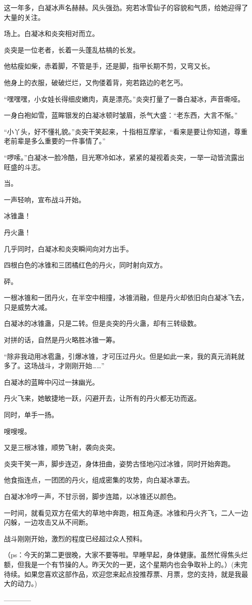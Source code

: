 \begin{this_body}
这一年多，白凝冰声名赫赫。风头强劲。宛若冰雪仙子的容貌和气质，给她迎得了大量的关注。

场上。白凝冰和炎突相对而立。

炎突是一位老者，长着一头蓬乱枯槁的长发。

他枯瘦如柴，赤着脚，不管是手，还是脚，指甲长期不剪，又弯又长。

他身上的衣服，破破烂烂，又佝偻着背，宛若路边的老乞丐。

“嘿嘿嘿，小女娃长得细皮嫩肉，真是漂亮。”炎突打量了一番白凝冰，声音嘶哑。

一身白袍如雪，蓝眸银发的白凝冰顿时皱眉，杀气大盛：“老东西，大言不惭。”

“小丫头，好不懂礼貌。”炎突干笑起来，十指相互摩挲，“看来是要让你知道，尊重老前辈是多么重要的一件事情了。”

“啰嗦。”白凝冰一脸冷酷，目光寒冷如冰，紧紧的凝视着炎突，一举一动皆流露出旺盛的斗志。

当。

一声轻响，宣布战斗开始。

冰锥蛊！

丹火蛊！

几乎同时，白凝冰和炎突瞬间向对方出手。

四根白色的冰锥和三团橘红色的丹火，同时射向双方。

砰。

一根冰锥和一团丹火，在半空中相撞，冰锥消融，但是丹火却依旧向白凝冰飞去，只是威势大减。

白凝冰的冰锥蛊，只是二转。但是炎突的丹火蛊，却有三转级数。

对拼的话，自然是丹火略胜冰锥一筹。

“除非我动用冰雹蛊，引爆冰锥，才可压过丹火。但是如此一来，我的真元消耗就多了。这场战斗，才刚刚开始……”

白凝冰的蓝眸中闪过一抹幽光。

丹火飞来，她敏捷地一跃，闪避开去，让所有的丹火都无功而返。

同时，单手一扬。

嗖嗖嗖。

又是三根冰锥，顺势飞射，袭向炎突。

炎突干笑一声，脚步连迈，身体扭曲，姿势古怪地闪过冰锥，同时开始奔跑。

他食指连点，一团团的丹火，组成密集的攻势，向白凝冰罩去。

白凝冰冷哼一声，不甘示弱，脚步连踏，以冰锥还以颜色。

一时间，就看见双方在偌大的草地中奔跑，相互角逐。冰锥和丹火齐飞，二人一边闪躲，一边攻击又从不间断。

战斗刚刚开始，激烈的程度已经超过众人预料。

（ps：今天的第二更很晚，大家不要等啦。早睡早起，身体健康。虽然忙得焦头烂额，但我是一个有节操的人。昨天欠的一更，这个星期内也会争取补上的。）(未完待续。如果您喜欢这部作品，欢迎您来起点投推荐票、月票，您的支持，就是我最大的动力。)

------------

\end{this_body}

